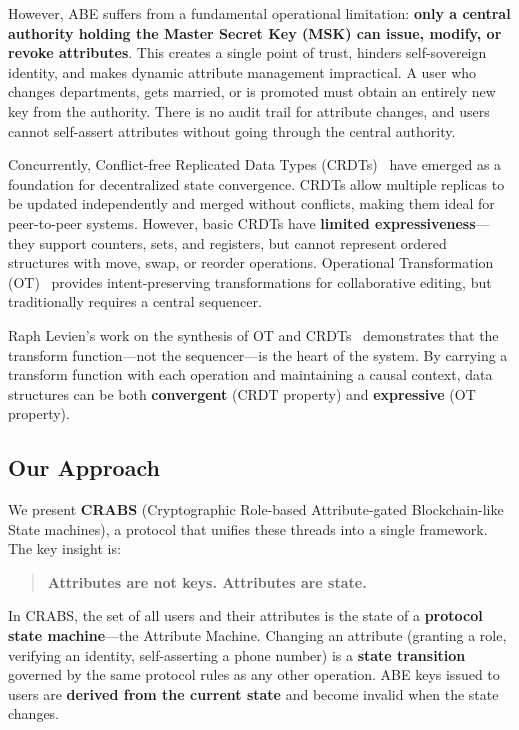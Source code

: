 \documentclass[11pt,a4paper]{article}
\begin{document}
However, ABE suffers from a fundamental operational limitation: \textbf{only a central authority holding the Master Secret Key (MSK) can issue, modify, or revoke attributes}. This creates a single point of trust, hinders self-sovereign identity, and makes dynamic attribute management impractical. A user who changes departments, gets married, or is promoted must obtain an entirely new key from the authority. There is no audit trail for attribute changes, and users cannot self-assert attributes without going through the central authority.

Concurrently, Conflict-free Replicated Data Types (CRDTs)~\cite{shapiro2011crdt} have emerged as a foundation for decentralized state convergence. CRDTs allow multiple replicas to be updated independently and merged without conflicts, making them ideal for peer-to-peer systems. However, basic CRDTs have \textbf{limited expressiveness}---they support counters, sets, and registers, but cannot represent ordered structures with move, swap, or reorder operations. Operational Transformation (OT)~\cite{ellis1989ot} provides intent-preserving transformations for collaborative editing, but traditionally requires a central sequencer.

Raph Levien's work on the synthesis of OT and CRDTs~\cite{levien2016synthesis} demonstrates that the transform function---not the sequencer---is the heart of the system. By carrying a transform function with each operation and maintaining a causal context, data structures can be both \textbf{convergent} (CRDT property) and \textbf{expressive} (OT property).

\subsection{Our Approach}

We present \textbf{CRABS} (Cryptographic Role-based Attribute-gated Blockchain-like State machines), a protocol that unifies these threads into a single framework. The key insight is:

\begin{quote}
\textbf{Attributes are not keys. Attributes are state.}
\end{quote}

In CRABS, the set of all users and their attributes is the state of a \textbf{protocol state machine}---the Attribute Machine. Changing an attribute (granting a role, verifying an identity, self-asserting a phone number) is a \textbf{state transition} governed by the same protocol rules as any other operation. ABE keys issued to users are \textbf{derived from the current state} and become invalid when the state changes.
\end{document}
